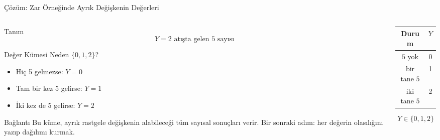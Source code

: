 \documentclass[light]{lutbeamer}
\begin{document}
\begin{frame}{Çözüm: Zar Örneğinde Ayrık Değişkenin Değerleri}
    \small
    \begin{columns}[T]
        \begin{column}{0.52\textwidth}
            \begin{block}{Tanım}
                \[
                Y = \text{2 atışta gelen 5 sayısı}
                \]
            \end{block}

            \begin{block}{Değer Kümesi Neden \(\{0,1,2\}\)?}
                \begin{itemize}
                    \item Hiç 5 gelmezse: \(Y=0\)
                    \item Tam bir kez 5 gelirse: \(Y=1\)
                    \item İki kez de 5 gelirse: \(Y=2\)
                \end{itemize}
            \end{block}

            \begin{alertblock}{Bağlantı}
                Bu küme, ayrık rastgele değişkenin alabileceği tüm sayısal sonuçları verir. Bir sonraki adım: her değerin olasılığını yazıp dağılımı kurmak.
            \end{alertblock}
        \end{column}
        \begin{column}{0.46\textwidth}
            \centering

            \vspace{0.2cm}
            \begin{tabular}{c|c}
                Durum & \(Y\) \\
                \hline
                \(5\) yok & 0 \\
                bir tane \(5\) & 1 \\
                iki tane \(5\) & 2 \\
            \end{tabular}

            \vspace{0.2cm}
            \[
            Y \in \{0,1,2\}
            \]
        \end{column}
    \end{columns}
\end{frame}
\end{document}

